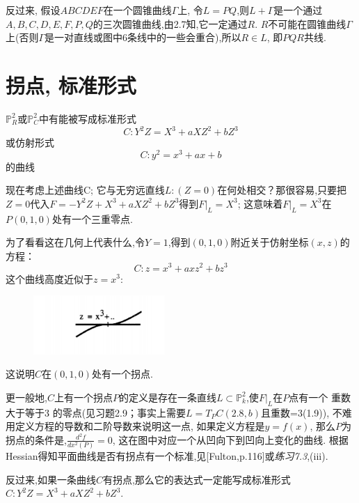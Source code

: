 \documentclass[UTF8]{book}
\begin{document}
		
			反过来, 假设$ ABCDEF $在一个圆锥曲线$\Gamma$上, 令$ L=PQ $,则$L+\Gamma$是一个通过$ A,B,C,D,E,F,P,Q $的三次圆锥曲线,由2.7知,它一定通过$ R $. $ R $不可能在圆锥曲线$\Gamma$上(否则$\Gamma$是一对直线或图中6条线中的一些会重合),所以$R\in L$, 即$ PQR $共线.
	\section{拐点, 标准形式}
		$\mathbb{P}^{2}_{R}$或$\mathbb{P}^{2}_{C}$中有能被写成标准形式
		\begin{equation*}
		C:Y^{2}Z=X^{3}+aXZ^{2}+bZ^{3}
		\end{equation*}
		或仿射形式
		\begin{equation*}
		C:y^{2}=x^{3}+ax+b
		\end{equation*}的曲线
	
		
		现在考虑上述曲线C; 它与无穷远直线$ L:(Z=0) $在何处相交？那很容易,只要把$ Z=0 $代入$F=-Y^{2}Z+X^{3}+aXZ^{2}+bZ^{3}$得到$F|_{L}=X^{3}$; 这意味着$F|_{L}=X^{3}$在$ P(0,1,0) $处有一个三重零点.
		
		为了看看这在几何上代表什么,令$ Y=1 $,得到$ (0,1,0) $附近关于仿射坐标$ (x,z) $的方程：
		\begin{equation*}
		C:z=x^{3}+axz^{2}+bz^{3}
		\end{equation*}
		这个曲线高度近似于$z=x^{3}$:
		
		
		\begin{figure}[h]
		  \centering
		  \includegraphics[width=5cm]{38.jpg}\\
		\end{figure}
	
	
	
		这说明$ C $在$ (0,1,0) $处有一个拐点.
		
		
		更一般地,$ C $上有一个拐点$ P $的定义是存在一条直线$L\subset \mathbb{P}^{2}_{k}$,使$F|_{L}$在$ P $点有一个 重数大于等于3 的零点(见习题2.9；事实上需要$L=T_{P}C(2.8,b)$且重数=3(1.9)), 不难用定义方程的导数和二阶导数来说明这一点, 如果定义方程是$ y=f(x) $, 那么$ P $为拐点的条件是,$\frac{d^{2}f}{dx^{2}(P)}=0$, 这在图中对应一个从凹向下到凹向上变化的曲线. 根据Hessian得知平面曲线是否有拐点有一个标准,见[Fulton,p.116]或\textit{练习7.3},(iii).
		
		
		反过来,如果一条曲线$ C $有拐点,那么它的表达式一定能写成标准形式$C:Y^{2}Z=X^{3}+aXZ^{2}+bZ^{3}$.
\end{document}
